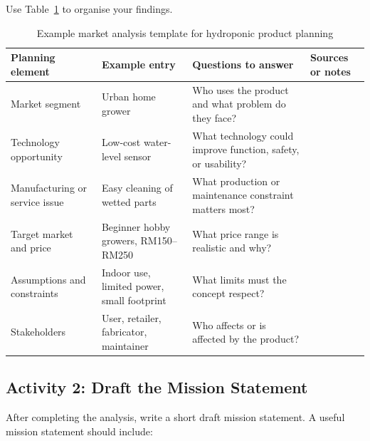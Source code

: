 Use Table~\ref{tab:session56-market-analysis} to organise your findings.

\begin{table}[H]
\centering
\caption{Example market analysis template for hydroponic product planning}
\label{tab:session56-market-analysis}
\renewcommand{\arraystretch}{1.2}
\begin{tabularx}{\textwidth}{|>{\raggedright\arraybackslash}p{}|>{\raggedright\arraybackslash}p{}|>{\raggedright\arraybackslash}X|>{\raggedright\arraybackslash}p{}|}
\hline
\textbf{Planning element} & \textbf{Example entry} & \textbf{Questions to answer} & \textbf{Sources or notes} \\
\hline
Market segment & Urban home grower & Who uses the product and what problem do they face? &  \\
\hline
Technology opportunity & Low-cost water-level sensor & What technology could improve function, safety, or usability? &  \\
\hline
Manufacturing or service issue & Easy cleaning of wetted parts & What production or maintenance constraint matters most? &  \\
\hline
Target market and price & Beginner hobby growers, RM150--RM250 & What price range is realistic and why? &  \\
\hline
Assumptions and constraints & Indoor use, limited power, small footprint & What limits must the concept respect? &  \\
\hline
Stakeholders & User, retailer, fabricator, maintainer & Who affects or is affected by the product? &  \\
\hline
\end{tabularx}
\end{table}

\subsection{Activity 2: Draft the Mission Statement}

After completing the analysis, write a short draft mission statement. A useful mission statement should include:


